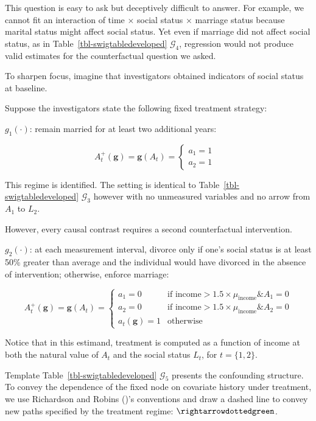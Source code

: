 \documentclass[
  single column]{article}
\begin{document}
This question is easy to ask but deceptively difficult to answer. For
example, we cannot fit an interaction of time \(\times\) social status
\(\times\) marriage status because marital status might affect social
status. Yet even if marriage did not affect social status, as in
Table~\ref{tbl-swigtabledeveloped} \(\mathcal{G}_4\), regression would
not produce valid estimates for the counterfactual question we asked.

To sharpen focus, imagine that investigators obtained indicators of
social status at baseline.

Suppose the investigators state the following fixed treatment strategy:

\(g_1(\cdot)\): remain married for at least two additional years:

\[
A_t^{+}(\mathbf{g}) = \mathbf{g}(A_{t}) = \begin{cases} 
   a_{1} = 1 & \\ 
   a_{2} = 1 &   
\end{cases}
\]

This regime is identified. The setting is identical to
Table~\ref{tbl-swigtabledeveloped} \(\mathcal{G}_3\) however with no
unmeasured variables and no arrow from \(A_1\) to \(L_2\).

However, every causal contrast requires a second counterfactual
intervention.

\(g_2(\cdot)\): at each measurement interval, divorce only if one's
social status is at least 50\% greater than average and the individual
would have divorced in the absence of intervention; otherwise, enforce
marriage:

\[
A_t^{+}(\mathbf{g}) = \mathbf{g}(A_{t}) = \begin{cases} 
   a_{1} = 0 & \text{if income} > 1.5 \times  \mu_{\text{income}} \& A_1 = 0 \\ 
   a_{2} = 0 & \text{if income} > 1.5 \times  \mu_{\text{income}} \& A_2 = 0 \\ 
   a_{t}(\mathbf{g}) = 1 & \text{otherwise} 
\end{cases}
\]

Notice that in this estimand, treatment is computed as a function of
income at both the natural value of \(A_t\) and the social status
\(L_t\), for \(t = \{1,2\}\).

Template Table~\ref{tbl-swigtabledeveloped} \(\mathcal{G}_5\) presents
the confounding structure. To convey the dependence of the fixed node on
covariate history under treatment, we use Richardson and Robins
()'s conventions and draw a dashed
line to convey new paths specified by the treatment regime:
\(\rightarrowdottedgreen\).
\end{document}
